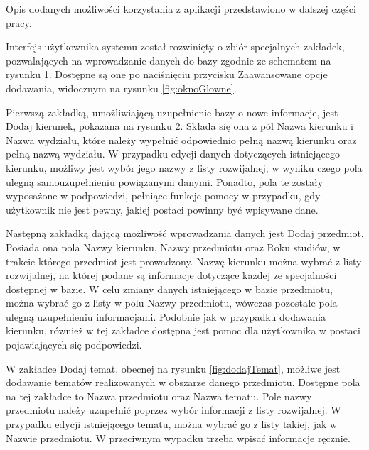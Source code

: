 \begin{figure}
\label{fig:program}
\end{figure}

Opis dodanych możliwości korzystania z aplikacji przedstawiono w dalszej części pracy.

Interfejs użytkownika systemu został rozwinięty o zbiór specjalnych zakładek, pozwalających na wprowadzanie danych do bazy zgodnie ze schematem na rysunku \ref{fig:program}. Dostępne są one po naciśnięciu przycisku Zaawansowane opcje dodawania, widocznym na rysunku \ref{fig:oknoGlowne}. 

Pierwszą zakładką, umożliwiającą uzupełnienie bazy o nowe informacje, jest Dodaj kierunek, pokazana na rysunku \ref{fig:dodajSpecjalizacje}. Składa się ona z pól Nazwa kierunku i Nazwa wydziału, które należy wypełnić odpowiednio pełną nazwą kierunku oraz pełną nazwą wydziału. W przypadku edycji danych dotyczących istniejącego kierunku, możliwy jest wybór jego nazwy z listy rozwijalnej, w wyniku czego pola ulegną samouzupełnieniu powiązanymi danymi. Ponadto, pola te zostały wyposażone w podpowiedzi, pełniące funkcje pomocy w przypadku, gdy użytkownik nie jest pewny, jakiej postaci powinny być wpisywane dane. 
\begin{figure}
\label{fig:dodajSpecjalizacje}
\end{figure}

Następną zakładką dającą możliwość wprowadzania danych jest Dodaj przedmiot. Posiada ona pola Nazwy kierunku, Nazwy przedmiotu oraz Roku studiów, w trakcie którego przedmiot jest prowadzony. Nazwę kierunku można wybrać z listy rozwijalnej, na której podane są informacje dotyczące każdej ze specjalności dostępnej w bazie. W celu zmiany danych istniejącego w bazie przedmiotu, można wybrać go z listy w polu Nazwy przedmiotu, wówczas pozostałe pola ulegną uzupełnieniu informacjami. Podobnie jak w przypadku dodawania kierunku, również w tej zakładce dostępna jest pomoc dla użytkownika w postaci pojawiających się podpowiedzi. 
\begin{figure}
\label{fig:dodajGrupe}
\end{figure}

\begin{figure}
\label{fig:dodajPrzedmiot}
\end{figure}

W zakładce Dodaj temat, obecnej na rysunku \ref{fig:dodajTemat}, możliwe jest dodawanie tematów realizowanych w obszarze danego przedmiotu. Dostępne pola na tej zakładce to Nazwa przedmiotu oraz Nazwa tematu. Pole nazwy przedmiotu należy uzupełnić poprzez wybór informacji z listy rozwijalnej. W przypadku edycji istniejącego tematu, można wybrać go z listy takiej, jak w Nazwie przedmiotu. W przeciwnym wypadku trzeba wpisać informacje ręcznie.

